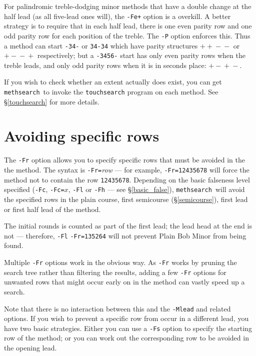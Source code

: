 \documentclass[a4paper,11pt,oneside]{book}
\makeatletter
\newcommand{\oidx}[2]{\index{#1@{\hspace*{-\optwidth}\texttt{-}#2}|ulink}}
\newcommand{\oi}[1]{\index{#1@{\hspace*{-\optwidth}\texttt{-}\texttt{#1}}}}
\def\methsearch{\texttt{meth\-search}}
\newcommand{\sref}[1]{\hyperref[#1]{\S\ref{#1}}}
\makeatother
\begin{document}
For palindromic treble-dodging minor methods that have a double change at 
the half lead (as all five-lead ones will), the \verb^-Fe+^ option is a
overkill.  A better strategy is to require that in each half lead, there 
is one even parity row and one odd parity row for each position
of the treble.  The \verb+-P+\oi{P} option enforces this.
Thus a method can start \verb+-34-+ or \verb+34-34+ which have 
parity structures $+{}+{}-{}-$ or $+{}-{}-{}+$ respectively; 
but a \verb+-3456-+ start has only even parity rows when the treble leads, 
and only odd parity rows when it is in seconds place: $+{}-{}+{}-$.

If you wish to check whether an extent actually does exist, you can 
get \methsearch\ to invoke the \texttt{touchsearch} program on each 
method.  See \sref{touchsearch} for more details.


\section{Avoiding specific rows}\label{avoidrow}

The \verb+-Fr+\oidx{Fr}{\texttt{Fr}} option allows you to specify
specific rows that must be avoided in the the method.%
The syntax is \verb+-Fr=+\textit{row} --- for example, \verb+-Fr=12435678+
will force the method not to contain the row \verb+12435678+.
Depending on the basic falseness level specified (\verb+-Fc+, \verb+-Fc=+$x$,
\verb+-Fl+ or \verb+-Fh+\oi{Fc}\oi{Fl}\oi{Fh} --- see \sref{basic_false}), 
\methsearch\ will avoid the specified rows in the plain course, first
semicourse (\sref{semicourse}), first lead or first half lead of the method.

The initial rounds is counted as part of the first lead;
the lead head at the end is not --- therefore, \verb+-Fl+ 
\verb+-Fr=135264+ will not prevent Plain Bob Minor from being found.

Multiple \verb+-Fr+ options work in the obvious way.  As \verb+-Fr+ works by 
pruning the search tree rather than filtering the results, adding a few 
\verb+-Fr+ options for unwanted rows that might occur early on in the 
method can vastly speed up a search.

Note that there is no interaction between this and the \verb+-Mlead+ and 
related options.  If you wish to prevent a specific row from occur in a 
different lead, you have two basic strategies.   Either you can use a 
\verb+-Fs+ option to specify the starting row of the method;
or you can work out the corresponding row to be avoided in the opening lead.  
\end{document}
